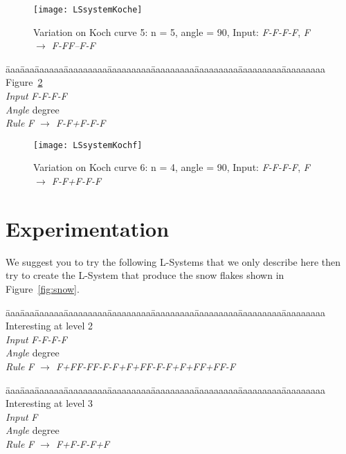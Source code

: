 \begin{figure}[!h]
\centerline{\texttt{[image: LSsystemKoche]}}
\caption{Variation on Koch curve 5: n = 5, angle = 90, Input: \emph{F-F-F-F}, \emph{F $\rightarrow$ F-FF--F-F}}
\label{fig:Koche}
\end{figure}







\begin{tabbing}
\=aaa\=aaa\=aaaaaa\=aaaaaaaaa\=aaaaaaaaa\=aaaaaaaaa\=aaaaaaaaa\=aaaaaaaaa\=aaaaaaaaa\kill
Figure~\ref{fig:Kochf} \\
\>\> \emph{Input} \>\>\emph{F-F-F-F}\\
\>\> \emph{Angle} \> degree\\
\>\> \emph{Rule}  \>\>\emph{F $\rightarrow$ F-F+F-F-F}
\end{tabbing}


\begin{figure}[!h]
\centerline{\texttt{[image: LSsystemKochf]}}
\caption{Variation on Koch curve 6: n = 4, angle = 90, Input: \emph{F-F-F-F}, \emph{F $\rightarrow$ F-F+F-F-F}}
\label{fig:Kochf}
\end{figure}



\section{Experimentation}

We suggest you to try the following L-Systems that we only describe here then try to create the L-System that produce the snow flakes shown in Figure~\ref{fig:snow}.

\begin{tabbing}
\=aaa\=aaa\=aaaaaa\=aaaaaaaaa\=aaaaaaaaa\=aaaaaaaaa\=aaaaaaaaa\=aaaaaaaaa\=aaaaaaaaa\kill
Interesting at level 2  \\
\>\> \emph{Input} \>\>\emph{F-F-F-F}\\
\>\> \emph{Angle} \> degree\\
\>\> \emph{Rule}  \>\> \emph{F $\rightarrow$ F+FF-FF-F-F+F+FF-F-F+F+FF+FF-F}
\end{tabbing}


\begin{tabbing}
\=aaa\=aaa\=aaaaaa\=aaaaaaaaa\=aaaaaaaaa\=aaaaaaaaa\=aaaaaaaaa\=aaaaaaaaa\=aaaaaaaaa\kill
Interesting at level 3 \\
\>\> \emph{Input} \>\>\emph{F}\\
\>\> \emph{Angle} \> degree\\
\>\> \emph{Rule}  \>\>\emph{F $\rightarrow$ F+F-F-F+F}
\end{tabbing}

